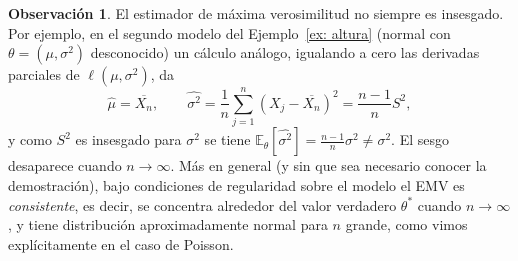 \documentclass[12pt]{amsart}
\theoremstyle{definition}
\newtheorem{remark}[lemma]{Observación}
\newcommand{\EE}{\ensuremath{\mathbb{E}}}
\begin{document}
\begin{remark} El estimador de máxima verosimilitud no siempre es insesgado. Por ejemplo, en el segundo modelo del Ejemplo~\ref{ex: altura} (normal con $\theta=(\mu,\sigma^2)$ desconocido) un cálculo análogo, igualando a cero las derivadas parciales de $\ell(\mu,\sigma^2)$, da
\[\widehat{\mu}=\overline{X_n},\qquad \widehat{\sigma^2}=\frac{1}{n}\sum_{j=1}^n\left(X_j-\overline{X_n}\right)^2=\frac{n-1}{n}S^2,\]
y como $S^2$ es insesgado para $\sigma^2$ se tiene $\EE_\theta[\widehat{\sigma^2}]=\frac{n-1}{n}\sigma^2\neq\sigma^2$. El sesgo desaparece cuando $n\to\infty$. Más en general (y sin que sea necesario conocer la demostración), bajo condiciones de regularidad sobre el modelo el EMV es \emph{consistente}, es decir, se concentra alrededor del valor verdadero $\theta^*$ cuando $n\to\infty$, y tiene distribución aproximadamente normal para $n$ grande, como vimos explícitamente en el caso de Poisson.
\end{remark}
\end{document}
